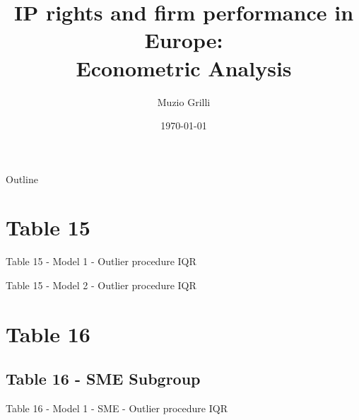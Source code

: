 \documentclass{beamer}					%
\title{IP rights and firm performance in Europe:\\ Econometric Analysis}	%
\author{Muzio Grilli}								%
\institute{European Patent Office}					%
\date{\today}									%
\begin{document}
	
	\begin{frame}
		\titlepage
	\end{frame}
	
	\begin{frame}{Outline}
		\tableofcontents
	\end{frame}
	
	
	\section{Table 15}
	
	\begin{frame}{Table 15 - Model 1 - Outlier procedure IQR}
		
	\end{frame}

%		

	\begin{frame}{Table 15 - Model 2 - Outlier procedure IQR}
		
	\end{frame}

%		
	
	\section{Table 16}
	\subsection{Table 16 - SME Subgroup}
	
	\begin{frame}{Table 16 - Model 1 - SME - Outlier procedure IQR}
		
	\end{frame}
\end{document}
